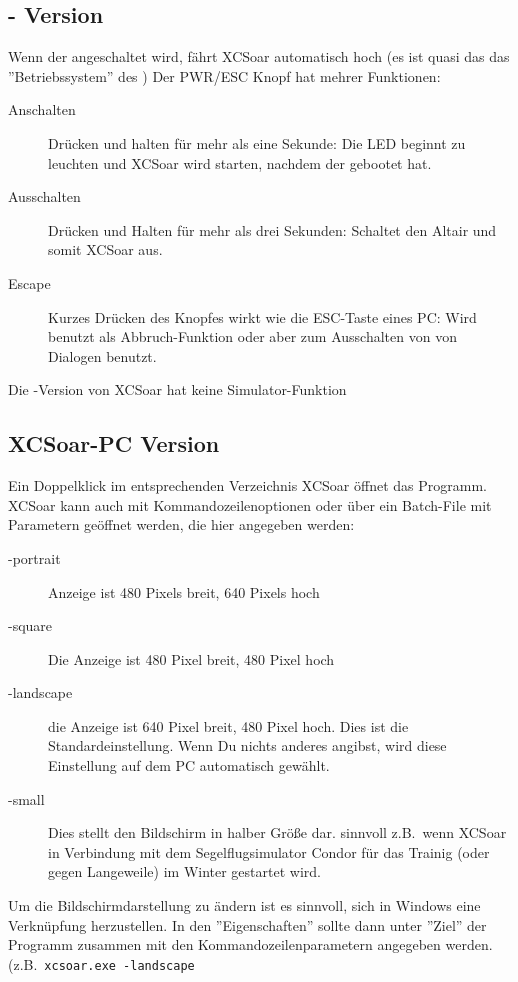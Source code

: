 \subsection*{\al - Version}
Wenn der \al angeschaltet wird, fährt {\textsf  XCSoar} automatisch hoch (es ist quasi das das ''Betriebssystem'' des \al) 
Der PWR/ESC Knopf hat mehrer Funktionen:
\begin{description}
\item[Anschalten]  Drücken und halten für mehr als eine Sekunde: Die LED beginnt zu leuchten und {\textsf  XCSoar} wird starten, nachdem der \al gebootet hat.
\item[Ausschalten]  Drücken und Halten für mehr als drei Sekunden: Schaltet den Altair und somit {\textsf  XCSoar} aus.
\item[Escape] Kurzes Drücken des Knopfes wirkt wie die ESC-Taste eines PC: Wird benutzt als Abbruch-Funktion oder aber zum 
              Ausschalten von von Dialogen benutzt.
\end{description}

\achtung Die \al-Version von {\textsf  XCSoar} hat keine Simulator-Funktion

\subsection*{{\textsf  XCSoar}-PC Version}
Ein Doppelklick im entsprechenden Verzeichnis {\textsf  XCSoar} öffnet das Programm. 
{\textsf  XCSoar} kann auch mit Kommandozeilenoptionen oder über ein Batch-File mit Parametern geöffnet werden, 
die hier angegeben werden: 

\begin{description}
\item[-portrait] Anzeige ist 480 Pixels breit, 640 Pixels hoch
\item[-square] Die Anzeige ist 480 Pixel breit, 480 Pixel hoch
\item[-landscape] die Anzeige ist 640 Pixel breit, 480 Pixel hoch. Dies ist die Standardeinstellung.
Wenn Du nichts anderes angibst, wird diese Einstellung auf dem PC automatisch gewählt.
\item[-small] Dies stellt den Bildschirm in halber Größe dar. sinnvoll z.B.\ wenn {\textsf  XCSoar} in Verbindung mit dem Segelflugsimulator 
{\sc Condor} für das Trainig (oder gegen Langeweile) im Winter gestartet wird.
\end{description}

Um die Bildschirmdarstellung zu ändern ist es sinnvoll, sich in Windows eine Verknüpfung herzustellen. 
In den ''Eigenschaften'' sollte dann unter ''Ziel'' der Programm zusammen mit den Kommandozeilenparametern 
angegeben werden. (z.B.\ \texttt{xcsoar.exe -landscape}


